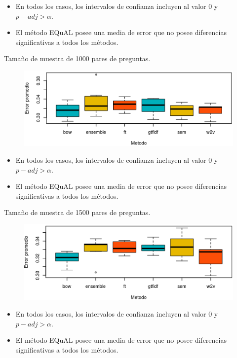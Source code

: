 \begin{frame}
	\begin{itemize}
		\item En todos los casos, los intervalos de confianza incluyen al valor 0 y \(p{-}adj > \alpha\).
		\item El método EQuAL posee una media de error que no posee diferencias significativas a todos los métodos.
	\end{itemize}

	\framebreak

	Tamaño de muestra de 1000 pares de preguntas.
	\begin{figure}[!htbp]
		\centering
		\includegraphics[width=0.7\linewidth]{../10_resultados/imagenes/anova_1000}
		\label{fig:anova1000-1}
	\end{figure}

	\begin{itemize}
		\item En todos los casos, los intervalos de confianza incluyen al valor 0 y \(p{-}adj > \alpha\).
		\item El método EQuAL posee una media de error que no posee diferencias significativas a todos los métodos.
	\end{itemize}

	\framebreak

	Tamaño de muestra de 1500 pares de preguntas.
	\begin{figure}[!htbp]
		\centering
		\includegraphics[width=0.7\linewidth]{../10_resultados/imagenes/anova_1500}
		\label{fig:anova1500-1}
	\end{figure}

	\begin{itemize}
		\item En todos los casos, los intervalos de confianza incluyen al valor 0 y \(p{-}adj > \alpha\).
		\item El método EQuAL posee una media de error que no posee diferencias significativas a todos los métodos.
	\end{itemize}


\end{frame}
